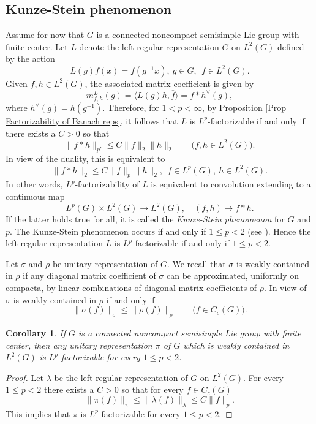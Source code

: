 \documentclass[12pt,letterpaper,titlepage,reqno]{amsart}
\theoremstyle{plain}
\newtheorem{cor}[theorem]{Corollary}
\theoremstyle{definition}
\numberwithin{equation}{section}
\begin{document}
\subsection{Kunze-Stein phenomenon}
Assume for now that $G$ is a connected noncompact semisimple Lie group with finite center.
Let $L$ denote the left regular representation $G$ on $L^2(G)$ defined by the action
$$
L(g)f(x)
=f(g^{-1}x),~g\in G,~~f\in L^2(G).
$$
Given $f,h\in L^2(G)$, the associated matrix coefficient is given by
$$
m^L_{f,h}(g)
=\langle L(g)h,\overline{f}\rangle = f\ast h^{\vee}(g),
$$
where $h^{\vee}(g)=h(g^{-1})$.
Therefore, for $1<p<\infty$, by Proposition \ref{Prop Factorizability of Banach reps}, it follows that $L$ is $L^p$-factorizable if and only if there exists a $C>0$ so that
$$
\|f\ast h\|_{p'}
\leq C \|f\|_2\|h\|_2\qquad \big( f,h\in L^2(G)\big).
$$
In view of the duality, this is equivalent to
$$
\|f\ast h\|_2
\leq C \|f\|_p\|h\|_2,~~f\in L^p(G),~h\in L^2(G).
$$
In other words, $L^p$-factorizability of $L$ is equivalent to convolution extending to a continuous map
$$
	L^p(G)\times L^2(G)\to L^2(G),\quad (f,h)\mapsto f*h.
$$
If the latter holds true for all, it is called the {\em Kunze-Stein phenomenon} for $G$ and $p$. The Kunze-Stein phenomenon occurs if and only if $1\leq p<2$ (see \cite{C}). Hence the left regular representation $L$ is $L^p$-factorizable if and only if  $1\leq p<2$.

Let $\sigma$ and $\rho$ be unitary representation of $G$. We recall that $\sigma$ is
weakly contained in $\rho$ if any diagonal matrix coefficient of $\sigma$ can be approximated,
uniformly on compacta, by linear combinations of diagonal matrix coefficients of $\rho$. In view of \cite[Lemma 1.23]{Eymard}
$\sigma$ is weakly contained in $\rho$ if and only if
$$
\|\sigma(f)\|_{\sigma}\leq \|\rho(f)\|_{\rho}\qquad\big(f\in C_{c}(G)\big).
$$

\begin{cor}
If $G$ is a connected noncompact semisimple Lie group with finite center, then any unitary representation $\pi$ of $G$ which is weakly contained in $L^{2}(G)$ is $L^{p}$-factorizable for every $1\leq p<2$.
\end{cor}

\begin{proof}
Let $\lambda$ be the left-regular representation of $G$ on $L^{2}(G)$.
For every $1\leq p<2$ there exists a $C>0$ so that for every $f\in C_{c}(G)$ 
$$
\|\pi(f)\|_{\pi}\leq \|\lambda(f)\|_{\lambda}\leq C \|f\|_{p}.
$$
This implies that $\pi$ is $L^{p}$-factorizable for every $1\leq p<2$.
\end{proof}
\end{document}
